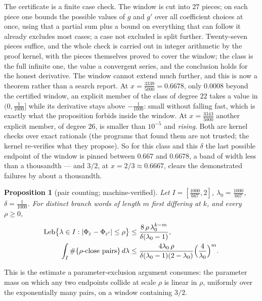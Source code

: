 \documentclass[11pt,reqno]{amsart}
\theoremstyle{plain}
\newtheorem{proposition}[theorem]{Proposition}
\theoremstyle{definition}
\theoremstyle{remark}
\begin{document}
The certificate is a finite case check. The window is cut into $27$ pieces;
on each piece one bounds the possible values of $g$ and $g'$ over all
coefficient choices at once, using that a partial sum plus a bound on
everything that can follow it already excludes most cases; a case not excluded
is split further. Twenty-seven pieces suffice, and the whole check is carried
out in integer arithmetic by the proof kernel, with the pieces themselves
proved to cover the window; the class is the full infinite one, the
value a convergent series, and the conclusion holds for the honest derivative.
The window cannot extend much further, and this is now a theorem rather than a
search report. At $x=\tfrac{3339}{5000}=0.6678$, only $0.0008$ beyond the
certified window, an explicit member of the class of degree $22$ takes a value
in $(0,\tfrac1{1000}]$ while its derivative stays above $-\tfrac1{1000}$: small
without falling fast, which is exactly what the proposition forbids inside the
window. At $x=\tfrac{3343}{5000}$ another explicit member, of degree $26$, is
smaller than $10^{-5}$ and \emph{rising}. Both are kernel checks over exact
rationals (the programs that found them are not trusted; the kernel re-verifies
what they propose). So for this class and this $\delta$ the last possible
endpoint of the window is pinned between $0.667$ and $0.6678$, a band of width
less than a thousandth --- and $3/2$, at $x=2/3\approx0.6667$, clears the
demonstrated failures by about a thousandth.

\begin{proposition}[pair counting; machine-verified]\label{prop:paircount}
Let $I=[\tfrac{1000}{667},2]$, $\lambda_0=\tfrac{1000}{667}$,
$\delta=\tfrac1{1000}$. For distinct branch words of length $m$ first
differing at $k$, and every $\rho\geq0$,
\begin{align*}
\mathrm{Leb}\bigl\{\lambda\in I:|\Phi_\varepsilon-\Phi_{\varepsilon'}|\leq\rho\bigr\}
&\leq\frac{8\,\rho\,\lambda_0^{k-m}}{\delta(\lambda_0-1)},\\
\int_I\#\{\rho\text{-close pairs}\}\,d\lambda
&\leq\frac{4\lambda_0\,\rho}{\delta(\lambda_0-1)(2-\lambda_0)}
\Bigl(\frac4{\lambda_0}\Bigr)^{m}.
\end{align*}
\end{proposition}

This is the estimate a parameter-exclusion argument consumes: the parameter
mass on which any two endpoints collide at scale $\rho$ is linear in $\rho$,
uniformly over the exponentially many pairs, on a window containing $3/2$.
\end{document}
